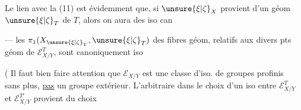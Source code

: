 
Le lien avec la  (11) est évidemment que, si $\unsure{\xi|\zeta}_X$ provient d'un  géom $\unsure{\xi|\zeta}_T$ de $T$, alors on aura des iso can


 --- les $\pi_1(X_{\unsure{\xi|\zeta}_Y},\unsure{\xi|\zeta}_T)$ des fibres géom, relatifs aux divers pts géom de $\mathcal E_{X/Y}^T$, sont canoniquement iso 

( Il faut bien faire attention que $\mathcal E_{X/Y}$  est une classe d'iso. de groupes profinis sans plus, \uline{pas} un groupe extérieur. L'arbitraire dans le choix d'un iso entre $\mathcal E_{X/Y}^T$ et $\mathcal E_{X/Y}^{T'}$ provient du choix

